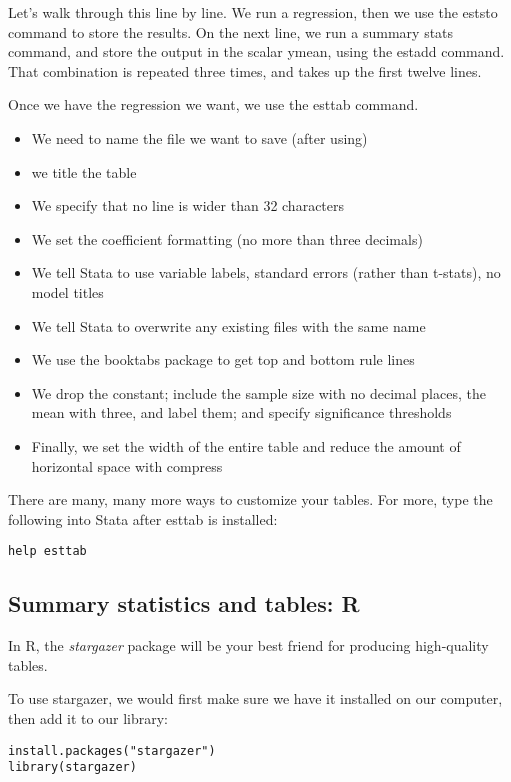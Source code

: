 \documentclass{article}
\begin{document}
Let's walk through this line by line. We run a regression, then we use the eststo command to store the results. On the next line, we run a summary stats command, and store the output in the scalar ymean, using the estadd command. That combination is repeated three times, and takes up the first twelve lines.

Once we have the regression we want, we use the esttab command.
\begin{itemize}
	\item We need to name the file we want to save (after using)
	\item we title the table
	\item We specify that no line is wider than 32 characters
	\item We set the coefficient formatting (no more than three decimals)
	\item We tell Stata to use variable labels, standard errors (rather than t-stats), no model titles
	\item We tell Stata to overwrite any existing files with the same name
	\item We use the booktabs package to get top and bottom rule lines
	\item We drop the constant; include the sample size with no decimal places, the mean with three, and label them; and specify significance thresholds
	\item Finally, we set the width of the entire table and reduce the amount of horizontal space with compress
\end{itemize}

There are many, many more ways to customize your tables. For more, type the following into Stata after esttab is installed:
\begin{verbatim}
help esttab
\end{verbatim}



\subsection{Summary statistics and tables: R}

In R, the \emph{stargazer} package will be your best friend for producing high-quality tables.

To use stargazer, we would first make sure we have it installed on our computer, then add it to our library:
\begin{verbatim}
install.packages("stargazer")
library(stargazer)
\end{verbatim}
\end{document}

